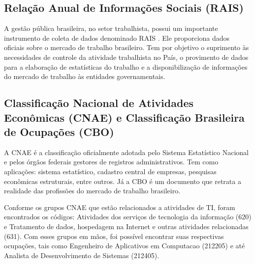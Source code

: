 \subsection{Relação Anual de Informações Sociais (RAIS)}

A gestão pública brasileira, no setor trabalhista, possui um importante instrumento de coleta de dados denominado RAIS \cite{Sobre_a_RAIS}. Ele proporciona dados oficiais sobre o mercado de trabalho brasileiro. Tem por objetivo o suprimento às necessidades de controle da atividade trabalhista no País, o provimento de dados para a elaboração de estatísticas do trabalho e a disponibilização de informações do mercado de trabalho às entidades governamentais.

\subsection{Classificação Nacional de Atividades Econômicas (CNAE) e Classificação Brasileira de Ocupações (CBO)}

A CNAE \cite{Sobre_a_CNAE} é a classificação oficialmente adotada pelo Sistema Estatístico Nacional e pelos órgãos federais gestores de registros administrativos. Tem como aplicações: sistema estatístico, cadastro central de empresas, pesquisas econômicas estruturais, entre outros. Já a CBO \cite{Sobre_a_CBO} é um documento que retrata a realidade das profissões do mercado de trabalho brasileiro. 

Conforme os grupos CNAE que estão relacionados a atividades de TI, foram encontrados os códigos: Atividades dos serviços de tecnologia da informação (620) e Tratamento de dados, hospedagem na Internet e outras atividades relacionadas (631). Com esses grupos em mãos, foi possível encontrar suas respectivas ocupações, tais como Engenheiro de Aplicativos em Computacao (212205) e até Analista de Desenvolvimento de Sistemas (212405).